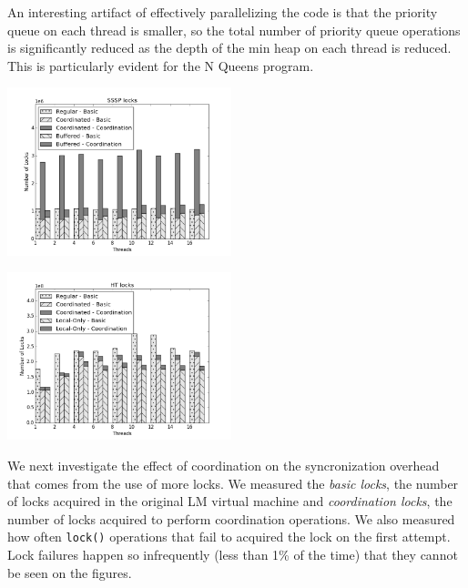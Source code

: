 An interesting artifact of effectively parallelizing the code is that
the priority queue on each thread is smaller, so the total number of
priority queue operations is significantly reduced as the depth of the
min heap on each thread is reduced.  This is particularly evident for
the N Queens program.

\begin{topfig}
   \begin{center}
      \includegraphics[width=6.5cm]{results/locks/sssp-locks.png}
   \end{center}
\end{topfig}

\begin{topfig}
   \begin{center}
      \includegraphics[width=6.5cm]{results/locks/ht-locks.png}
   \end{center}
\end{topfig}

We next investigate the effect of coordination on the syncronization
overhead that comes from the use of more locks.  We measured the
\emph{basic locks}, the number of locks acquired
in the original LM virtual machine and \emph{coordination locks}, the
number of locks acquired to perform coordination operations.  We also
measured how often \texttt{lock()} operations that fail to acquired
the lock on the first attempt.  Lock failures happen so infrequently
(less than 1\% of the time) that they cannot be seen on the figures.


